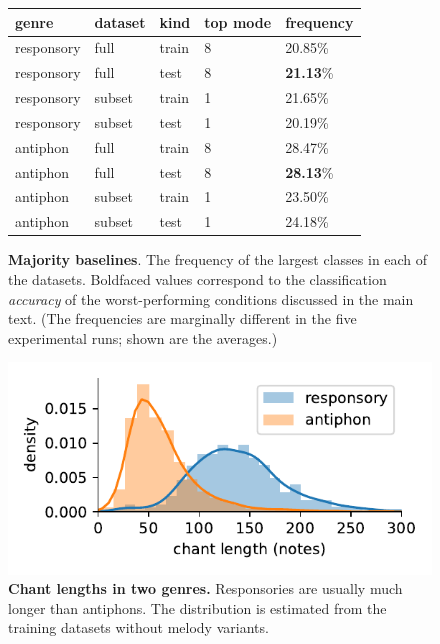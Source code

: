 \documentclass{article}
\begin{document}
\begin{figure}
\centering
\begin{tabular}{lllll} \toprule
genre      & dataset & kind  & top mode & frequency \\ \midrule
responsory & full   & train & 8     & 20.85\% \\
responsory & full   & test  & 8     & \textbf{21.13}\% \\
responsory & subset & train & 1     & 21.65\% \\
responsory & subset & test  & 1     & 20.19\% \\
antiphon   & full   & train & 8     & 28.47\% \\
antiphon   & full   & test  & 8     & \textbf{28.13}\% \\
antiphon   & subset & train & 1     & 23.50\% \\
antiphon   & subset & test  & 1     & 24.18\% \\
\bottomrule
\end{tabular}
\caption{\textbf{Majority baselines}. The frequency of the largest classes in each of the datasets. Boldfaced values correspond to the classification \emph{accuracy} of the worst-performing conditions discussed in the main text. (The frequencies are marginally different in the five experimental runs; shown are the averages.)}
\label{suppl:majority-baselines}
\end{figure}


\begin{figure}
    \centering
    \includegraphics[width=.4\textwidth]{figs/figS03-chant-length-distribution.pdf}
    \caption{
        \textbf{Chant lengths in two genres.}
        Responsories are usually much longer than antiphons. The distribution is estimated from the training datasets without melody variants.
        \label{suppl:chant-length-distributions}
    }
\end{figure}
\end{document}
